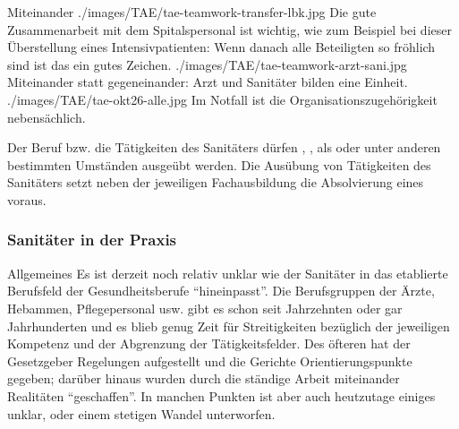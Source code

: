 \begin{PictureSeriesWide}{}{Miteinander}
{./images/TAE/tae-teamwork-transfer-lbk.jpg}
{Die gute
Zusammenarbeit mit dem Spitalspersonal ist wichtig, wie zum
Beispiel bei dieser Überstellung eines Intensivpatienten:
Wenn danach alle Beteiligten so fröhlich sind ist das
ein gutes Zeichen.}
{./images/TAE/tae-teamwork-arzt-sani.jpg}
{Miteinander statt gegeneinander: Arzt und Sanitäter bilden eine
Einheit.}
{./images/TAE/tae-okt26-alle.jpg}
{Im Notfall ist die
Organisationszugehörigkeit nebensächlich.}
{}
{}
\end{PictureSeriesWide}

{Der Beruf bzw. die Tätigkeiten des Sanitäters
dürfen , , als
 oder unter anderen bestimmten
Umständen%
ausgeübt werden. Die
 Ausübung von Tätigkeiten des Sanitäters
setzt neben der jeweiligen Fachausbildung die Absolvierung
eines  voraus. 
}






\subsubsection{Sanitäter in der Praxis}

\Text
{Allgemeines}%
{%
Es ist derzeit noch relativ unklar wie der Sanitäter in das
etablierte Berufsfeld der Gesundheitsberufe \enquote{hineinpasst}.
Die Berufsgruppen der Ärzte, Hebammen, Pflegepersonal usw.
gibt es schon seit Jahrzehnten oder gar Jahrhunderten und es
blieb genug Zeit für Streitigkeiten bezüglich der jeweiligen
Kompetenz und der Abgrenzung der Tätigkeitsfelder. Des
öfteren hat der Gesetzgeber Regelungen aufgestellt und die
Gerichte Orientierungspunkte gegeben; darüber hinaus wurden
durch die ständige Arbeit miteinander Realitäten
\enquote{geschaffen}. In manchen Punkten ist aber auch heutzutage
einiges unklar, oder einem stetigen Wandel unterworfen.
}%


